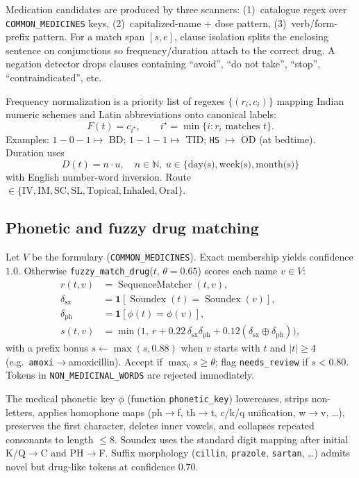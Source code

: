 \documentclass[11pt,a4paper]{article}
\begin{document}
Medication candidates are produced by three scanners: (1)~catalogue regex over \texttt{COMMON\_MEDICINES} keys, (2)~capitalized-name + dose pattern, (3)~verb/form-prefix pattern. For a match span $[s,e]$, clause isolation splits the enclosing sentence on conjunctions so frequency/duration attach to the correct drug. A negation detector drops clauses containing ``avoid'', ``do not take'', ``stop'', ``contraindicated'', etc.

Frequency normalization is a priority list of regexes $\{(r_i, c_i)\}$ mapping Indian numeric schemes and Latin abbreviations onto canonical labels:
\begin{equation}
  F(t) = c_{i^\star},\qquad i^\star = \min\{ i : r_i \text{ matches } t\}.
\end{equation}
Examples: $1{-}0{-}1 \mapsto$ BD; $1{-}1{-}1 \mapsto$ TID; \texttt{HS} $\mapsto$ OD (at bedtime). Duration uses
\begin{equation}
  D(t) = n \cdot u,\quad n\in\mathbb{N},\ u\in\{\text{day(s)},\text{week(s)},\text{month(s)}\}
\end{equation}
with English number-word inversion. Route $\in\{\text{IV},\text{IM},\text{SC},\text{SL},\text{Topical},\text{Inhaled},\text{Oral}\}$.

\subsection{Phonetic and fuzzy drug matching}
Let $V$ be the formulary (\texttt{COMMON\_MEDICINES}). Exact membership yields confidence $1.0$. Otherwise \texttt{fuzzy\_match\_drug}($t$, $\theta{=}0.65$) scores each name $v\in V$:
\begin{align}
  r(t,v) &= \operatorname{SequenceMatcher}(t,v), \\
  \delta_{\text{sx}} &= \mathbf{1}[\operatorname{Soundex}(t)=\operatorname{Soundex}(v)], \\
  \delta_{\text{ph}} &= \mathbf{1}[\phi(t)=\phi(v)], \\
  s(t,v) &= \min\bigl(1,\ r + 0.22\,\delta_{\text{sx}}\delta_{\text{ph}} + 0.12(\delta_{\text{sx}}\oplus\delta_{\text{ph}})\bigr),
\end{align}
with a prefix bonus $s \leftarrow \max(s, 0.88)$ when $v$ starts with $t$ and $|t|\ge 4$ (e.g.\ \texttt{amoxi}$\rightarrow$amoxicillin). Accept if $\max_v s \ge \theta$; flag \texttt{needs\_review} if $s<0.80$. Tokens in \texttt{NON\_MEDICINAL\_WORDS} are rejected immediately.

The medical phonetic key $\phi$ (function \texttt{phonetic\_key}) lowercases, strips non-letters, applies homophone maps (ph$\rightarrow$f, th$\rightarrow$t, c/k/q unification, w$\rightarrow$v, \ldots), preserves the first character, deletes inner vowels, and collapses repeated consonants to length $\le 8$. Soundex uses the standard digit mapping after initial K/Q$\rightarrow$C and PH$\rightarrow$F. Suffix morphology (\texttt{cillin}, \texttt{prazole}, \texttt{sartan}, \ldots) admits novel but drug-like tokens at confidence $0.70$.
\end{document}
